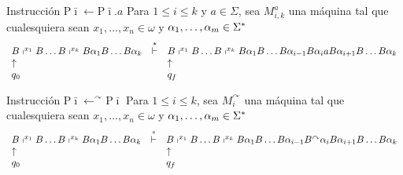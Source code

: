\begin{frame}
	\begin{block}{Instrucción $\mathrm{P}\bar{\imath} \leftarrow \mathrm{P}\bar{\imath}.a$}
		\PN Para $1 \leq i \leq k$ y $a \in \Sigma $, sea $M_{i,k}^{a}$ una máquina tal que cualesquiera sean $x_{1},
    \dotsc, x_{n} \in \omega$ y $\alpha_{1}, \dotsc,\alpha_{m} \in \Sigma^{\ast}$
		\minLetter
		\[
			\begin{array}{lcl}
				B \shortmid^{x_{1}} B \dotsc B \shortmid^{x_{k}} B \alpha_{1} B \dotsc B \alpha_{k} &\overset{\ast}{\vdash}& B
					\shortmid^{x_{1}} B \dotsc B \shortmid^{x_{k}} B \alpha_{1} B \dotsc B \alpha_{i-1} B \alpha_{i} a B
					\alpha_{i+1} B \dotsc B \alpha_{k} \\
				\uparrow && \uparrow \\
				q_{0} && q_{f}
			\end{array}
		\]
	\end{block}

  \begin{block}{Instrucción $\mathrm{P}\bar{\imath} \leftarrow ^{\curvearrowright}\mathrm{P}\bar{\imath}$}
    \PN Para $1 \leq i \leq k$, sea $M_{i}^{\curvearrowright}$ una máquina tal que cualesquiera sean $x_{1}, \dotsc,
    x_{n} \in \omega$ y $\alpha_{1}, \dotsc,\alpha_{m} \in \Sigma^{\ast}$
    \minLetter
    \[
      \begin{array}{lcl}
        B \shortmid^{x_{1}} B \dotsc B \shortmid^{x_{k}} B \alpha_{1} B \dotsc B \alpha_{k} &\overset{\ast}{\vdash}& B
          \shortmid^{x_{1}} B \dotsc B \shortmid^{x_{k}} B \alpha_{1} B \dotsc B \alpha_{i-1} B^{\curvearrowright}
          \alpha_{i} B \alpha_{i+1} B \dotsc B \alpha_{k} \\
        \uparrow && \uparrow \\
        q_{0} && q_{f}
      \end{array}
    \]
  \end{block}
\end{frame}
